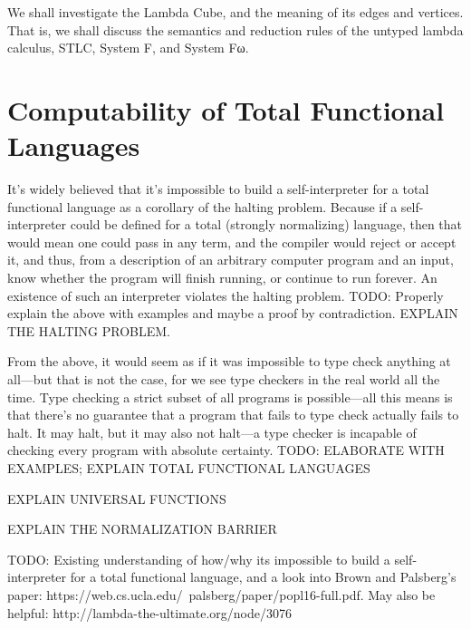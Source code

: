\documentclass{article}
\begin{document}


We shall investigate the Lambda Cube, and the meaning of its edges and vertices. That is, we shall discuss the semantics and reduction rules of the untyped lambda calculus, STLC, System F, and System Fω.

\section{Computability of Total Functional Languages}
It's widely believed that it's impossible to build a self-interpreter for a total functional language as a corollary of the halting problem. Because if a self-interpreter could be defined for a total (strongly normalizing) language, then that would mean one could pass in any term, and the compiler would reject or accept it, and thus, from a description of an arbitrary computer program and an input, know whether the program will finish running, or continue to run forever. An existence of such an interpreter violates the halting problem.
TODO: Properly explain the above with examples and maybe a proof by contradiction. EXPLAIN THE HALTING PROBLEM.

From the above, it would seem as if it was impossible to type check anything at all—but that is not the case, for we see type checkers in the real world all the time. Type checking a strict subset of all programs is possible—all this means is that there's no guarantee that a program that fails to type check actually fails to halt. It may halt, but it may also not halt—a type checker is incapable of checking every program with absolute certainty. TODO: ELABORATE WITH EXAMPLES; EXPLAIN TOTAL FUNCTIONAL LANGUAGES

EXPLAIN UNIVERSAL FUNCTIONS

EXPLAIN THE NORMALIZATION BARRIER

TODO: Existing understanding of how/why its impossible to build a self-interpreter for a total functional language, and a look into Brown and Palsberg's paper: https://web.cs.ucla.edu/~palsberg/paper/popl16-full.pdf. May also be helpful: http://lambda-the-ultimate.org/node/3076
\end{document}
